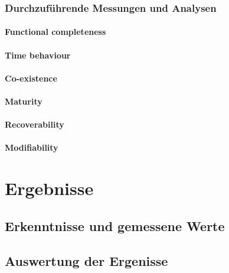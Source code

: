 \subsection{Durchzuführende Messungen und Analysen}

\subsubsection{Functional completeness}



\subsubsection{Time behaviour}
\subsubsection{Co-existence}
\subsubsection{Maturity}
\subsubsection{Recoverability}
\subsubsection{Modifiability}

\chapter{Ergebnisse}
\label{sec:ergeb}

\section{Erkenntnisse und gemessene Werte}

\section{Auswertung der Ergenisse}

